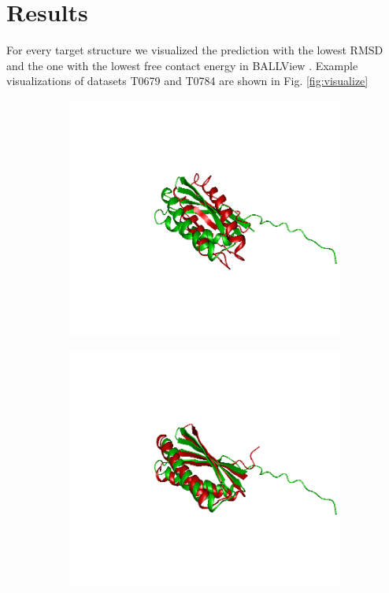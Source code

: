 \documentclass[11pt,a4paper]{article}
\begin{document}
\section{Results}
For every target structure we visualized the prediction with the lowest RMSD and the one with the lowest free contact energy in BALLView \citep{ballview}. Example visualizations of datasets T0679 and T0784 are shown in Fig. \ref{fig:visualize}

\begin{figure}
	\begin{subfigure}{.5\textwidth}
		\includegraphics[width=\textwidth]{figures/T0769TS442}
	\end{subfigure}
	\begin{subfigure}{.5\textwidth}
		\includegraphics[width=\textwidth]{figures/T0769TS241}
	\end{subfigure}


\end{figure}
\end{document}
